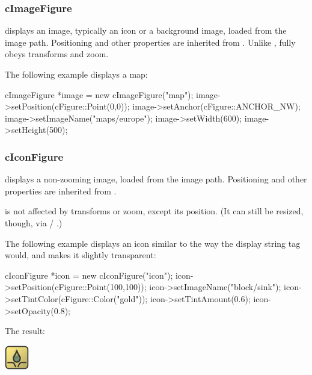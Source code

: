 \subsubsection{cImageFigure}

 displays an image, typically an icon or a background
image, loaded from the {\opp} image path. Positioning and other properties
are inherited from . Unlike ,
 fully obeys transforms and zoom.

The following example displays a map:

\begin{cpp}
cImageFigure *image = new cImageFigure("map");
image->setPosition(cFigure::Point(0,0));
image->setAnchor(cFigure::ANCHOR_NW);
image->setImageName("maps/europe");
image->setWidth(600);
image->setHeight(500);
\end{cpp}



\subsubsection{cIconFigure}

 displays a non-zooming image, loaded from the {\opp}
image path. Positioning and other properties are inherited from
.

 is not affected by transforms or zoom, except its position.
(It can still be resized, though, via  / .)

The following example displays an icon similar to the way the
 display string tag would, and makes
it slightly transparent:

\begin{cpp}
cIconFigure *icon = new cIconFigure("icon");
icon->setPosition(cFigure::Point(100,100));
icon->setImageName("block/sink");
icon->setTintColor(cFigure::Color("gold"));
icon->setTintAmount(0.6);
icon->setOpacity(0.8);
\end{cpp}


The result:

\begin{center}
\includegraphics{figures/figure-icon} %
\end{center}


